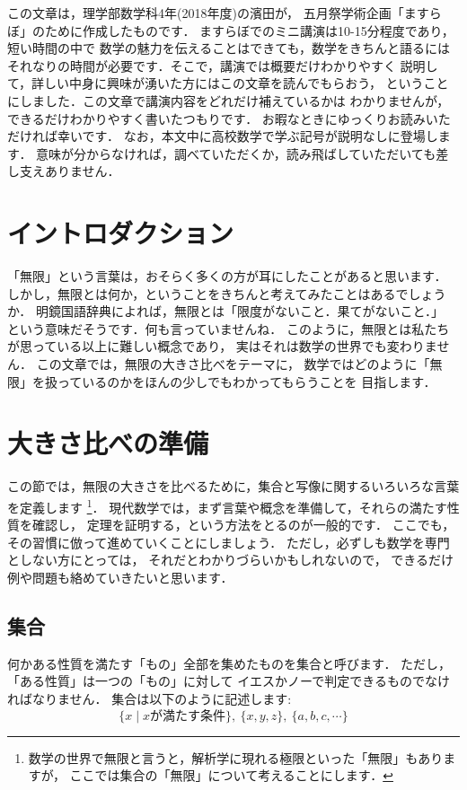 ﻿\documentclass[./main]{subfiles} %
\theoremstyle{definition}
\begin{document}

この文章は，理学部数学科4年(2018年度)の濱田が，
五月祭学術企画「ますらぼ」のために作成したものです．
ますらぼでのミニ講演は10-15分程度であり，短い時間の中で
数学の魅力を伝えることはできても，数学をきちんと語るには
それなりの時間が必要です．そこで，講演では概要だけわかりやすく
説明して，詳しい中身に興味が湧いた方にはこの文章を読んでもらおう，
ということにしました．この文章で講演内容をどれだけ補えているかは
わかりませんが，できるだけわかりやすく書いたつもりです．
お暇なときにゆっくりお読みいただければ幸いです．
なお，本文中に高校数学で学ぶ記号が説明なしに登場します．
意味が分からなければ，調べていただくか，読み飛ばしていただいても差し支えありません．

\section{イントロダクション}
「無限」という言葉は，おそらく多くの方が耳にしたことがあると思います．
しかし，無限とは何か，ということをきちんと考えてみたことはあるでしょうか．
明鏡国語辞典によれば，無限とは「限度がないこと．果てがないこと．」
という意味だそうです．何も言っていませんね．
このように，無限とは私たちが思っている以上に難しい概念であり，
実はそれは数学の世界でも変わりません．
この文章では，無限の大きさ比べをテーマに，
数学ではどのように「無限」を扱っているのかをほんの少しでもわかってもらうことを
目指します．

\section{大きさ比べの準備}
この節では，無限の大きさを比べるために，集合と写像に関するいろいろな言葉を定義します
\footnote{数学の世界で無限と言うと，解析学に現れる極限といった「無限」もありますが，
ここでは集合の「無限」について考えることにします．}．
現代数学では，まず言葉や概念を準備して，それらの満たす性質を確認し，
定理を証明する，という方法をとるのが一般的です．
ここでも，その習慣に倣って進めていくことにしましょう．
ただし，必ずしも数学を専門としない方にとっては，
それだとわかりづらいかもしれないので，
できるだけ例や問題も絡めていきたいと思います．

\subsection{集合}
何かある性質を満たす「もの」全部を集めたものを集合と呼びます．
ただし，「ある性質」は一つの「もの」に対して
イエスかノーで判定できるものでなければなりません．
集合は以下のように記述します:
\[
\{x\mid xが満たす条件\},\ \{x,y,z\},\ \{a,b,c,\cdots\}
\]
\end{document}

